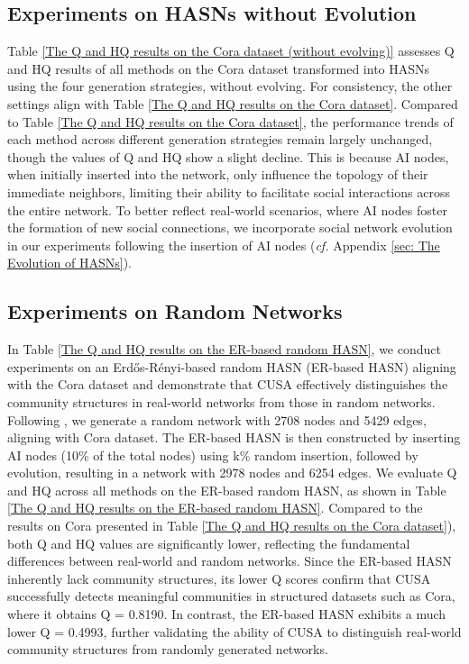 \subsection{Experiments on HASNs without Evolution}
Table \ref{The Q and HQ results on the Cora dataset (without evolving)} assesses Q and HQ results of all methods on the Cora dataset transformed into HASNs using the four generation strategies, without evolving. For consistency, the other settings align with Table \ref{The Q and HQ results on the Cora dataset}. Compared to Table \ref{The Q and HQ results on the Cora dataset}, the performance trends of each method across different generation strategies remain largely unchanged, though the values of Q and HQ show a slight decline. This is because AI nodes, when initially inserted into the network, only influence the topology of their immediate neighbors, limiting their ability to facilitate social interactions across the entire network. To better reflect real-world scenarios, where AI nodes foster the formation of new social connections, we incorporate social network evolution in our experiments following the insertion of AI nodes (\textit{cf.} Appendix \ref{sec: The Evolution of HASNs}).


\subsection{Experiments on Random Networks}
In Table \ref{The Q and HQ results on the ER-based random HASN}, we conduct experiments on an Erdős-Rényi-based random HASN (ER-based HASN) \cite{erdds1959random} aligning with the Cora dataset and demonstrate that CUSA effectively distinguishes the community structures in real-world networks from those in random networks. Following \cite{erdds1959random}, we generate a random network with 2708 nodes and 5429 edges, aligning with Cora dataset. The ER-based HASN is then constructed by inserting AI nodes (10\% of the total nodes) using k\% random insertion, followed by evolution, resulting in a network with 2978 nodes and 6254 edges. We evaluate Q and HQ across all methods on the ER-based random HASN, as shown in Table \ref{The Q and HQ results on the ER-based random HASN}. Compared to the results on Cora presented in Table \ref{The Q and HQ results on the Cora dataset}), both Q and HQ values are significantly lower, reflecting the fundamental differences between real-world and random networks. Since the ER-based HASN inherently lack community structures, its lower Q scores confirm that CUSA successfully detects meaningful communities in structured datasets such as Cora, where it obtains Q = 0.8190. In contrast, the ER-based HASN exhibits a much lower Q = 0.4993, further validating the ability of CUSA to distinguish real-world community structures from randomly generated networks.


